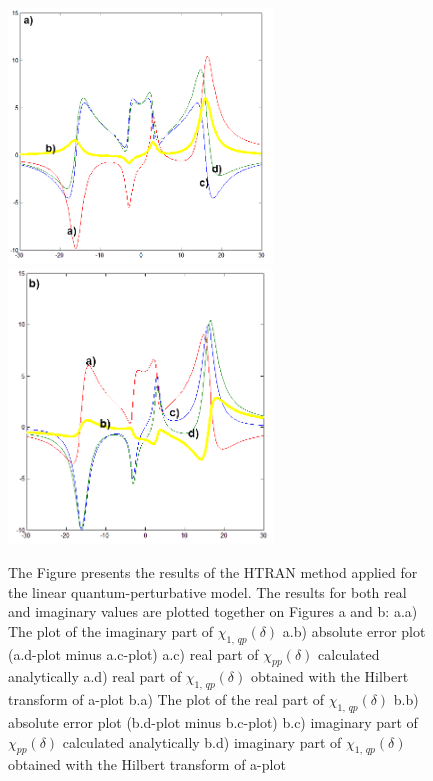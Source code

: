 \documentclass[12pt,twoside,a4paper]{article}
\numberwithin{equation}{subsection}
\numberwithin{figure}{subsection}
\begin{document}
\begin{figure} 
  \includegraphics[width=70mm]{img/htran_qp_2da.png} 
  \includegraphics[width=70mm]{img/htran_qp_2db.png}  
  \caption{The Figure presents the results of the HTRAN method applied for the linear quantum-perturbative model. The results for both real
  and imaginary values are plotted together on Figures a and b:
  a.a) The plot of the imaginary part of ${\chi_{1, \,qp}}(\delta )$ 
  a.b) absolute error plot (a.d-plot minus a.c-plot) 
  a.c) real part of ${\chi_{pp}}(\delta )$ calculated analytically
  a.d) real part of ${\chi_{1, \,qp}}(\delta )$ obtained with the Hilbert transform of a-plot
  b.a) The plot of the real part of ${\chi_{1, \,qp}}(\delta )$
  b.b) absolute error plot (b.d-plot minus b.c-plot)  
  b.c) imaginary part of ${\chi_{pp}}(\delta )$ calculated analytically 
  b.d) imaginary part of ${\chi_{1, \,qp}}(\delta )$ obtained with the Hilbert transform of a-plot 
  \label{fig:htran_qp_2d}}
\end{figure}
\end{document}

